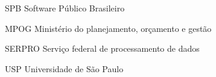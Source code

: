 \begin{siglas}
  \item[SPB] Software Público Brasileiro
  \item[MPOG] Ministério do planejamento, orçamento e gestão
  \item[SERPRO] Serviço federal de processamento de dados
  \item[USP] Universidade de São Paulo
\end{siglas}

